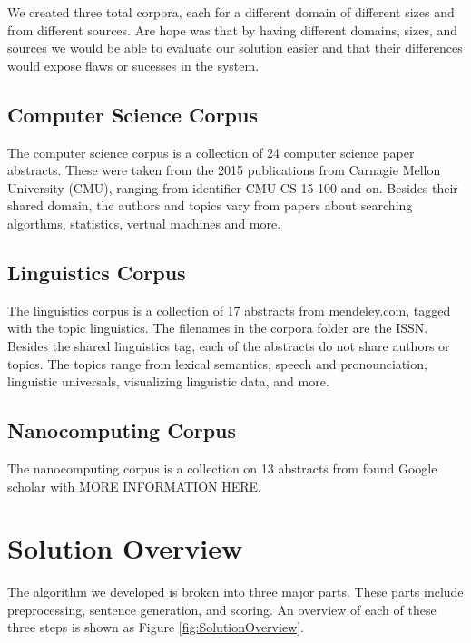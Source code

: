 \documentclass[letterpaper, 10 pt, conference]{ieeeconf}  %
\begin{document}
We created three total corpora, each for a different domain of different sizes and from different sources. Are hope was that by having different domains, sizes, and sources we would be able to evaluate our solution easier and that their differences would expose flaws or sucesses in the system.

\subsection{Computer Science Corpus}

The computer science corpus is a collection of 24 computer science paper abstracts. These were taken from the 2015 publications from Carnagie Mellon University (CMU), ranging from identifier CMU-CS-15-100 and on. Besides their shared domain, the authors and topics vary from papers about searching algorthms, statistics, vertual machines and more.

\subsection{Linguistics Corpus}

The linguistics corpus is a collection of 17 abstracts from mendeley.com, tagged with the topic linguistics. The filenames in the corpora folder are the ISSN. Besides the shared linguistics tag, each of the abstracts do not share authors or topics. The topics range from lexical semantics, speech and pronounciation, linguistic universals, visualizing linguistic data, and more.

\subsection{Nanocomputing Corpus}

The nanocomputing corpus is a collection on 13 abstracts from found Google scholar with MORE INFORMATION HERE.

\section{Solution Overview}

The algorithm we developed is broken into three major parts. These parts include preprocessing, sentence generation, and scoring. An overview of each of these three steps is shown as Figure \ref{fig:SolutionOverview}.
\end{document}
